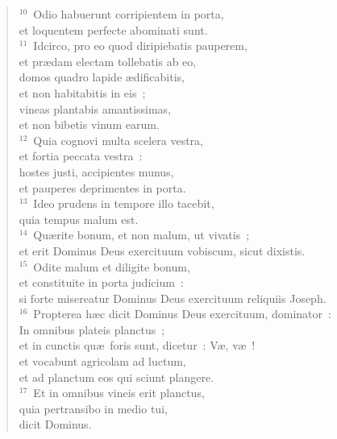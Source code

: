 \begin{flushleft}
\begin{verse}
${}^{10}$~Odio habuerunt corripientem in porta,\\ et loquentem perfecte abominati sunt.\\
${}^{11}$~Idcirco, pro eo quod diripiebatis pauperem,\\ et pr\ae dam electam tollebatis ab eo,\\ domos quadro lapide \ae dificabitis,\\ et non habitabitis in eis~;\\ vineas plantabis amantissimas,\\ et non bibetis vinum earum.\\
${}^{12}$~Quia cognovi multa scelera vestra,\\ et fortia peccata vestra~:\\ hostes justi, accipientes munus,\\ et pauperes deprimentes in porta.\\
${}^{13}$~Ideo prudens in tempore illo tacebit,\\ quia tempus malum est.\\
${}^{14}$~Qu\ae rite bonum, et non malum, ut vivatis~;\\ et erit Dominus Deus exercituum vobiscum, sicut dixistis.\\
${}^{15}$~Odite malum et diligite bonum,\\ et constituite in porta judicium~:\\ si forte misereatur Dominus Deus exercituum reliquiis Joseph.\\
${}^{16}$~Propterea h\ae c dicit Dominus Deus exercituum, dominator~:\\ In omnibus plateis planctus~;\\ et in cunctis qu\ae\ foris sunt, dicetur~: V\ae , v\ae~!\\ et vocabunt agricolam ad luctum,\\ et ad planctum eos qui sciunt plangere.\\
${}^{17}$~Et in omnibus vineis erit planctus,\\ quia pertransibo in medio tui,\\ dicit Dominus.\end{verse}\end{flushleft}


